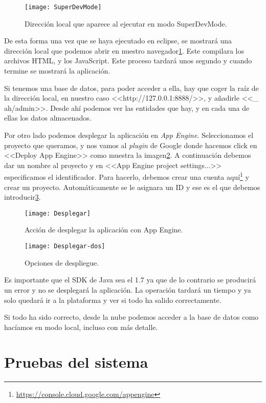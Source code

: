 \begin{figure}
\centering
\texttt{[image: SuperDevMode]}
\caption{Dirección local que aparece al ejecutar en modo SuperDevMode.}
\label{fig:5.4}
\end{figure}

De esta forma una vez que se haya ejecutado en eclipse, se mostrará una dirección local que podemos abrir en nuestro navegador\ref{fig:5.4}. Este compilara los archivos HTML, y los JavaScript. Este proceso tardará unos segundo y cuando termine se mostrará la aplicación.

Si tenemos una base de datos, para poder acceder a ella, hay que coger la raíz de la dirección local, en nuestro caso <<http://127.0.0.1:8888/>>, y añadirle <<\_ ah/admin>>. Desde ahí podemos ver las entidades que hay, y en cada una de ellas los datos almacenados.


Por otro lado podemos desplegar la aplicación en \emph{App Engine}. Seleccionamos el proyecto que queramos, y nos vamos al \emph{plugin} de Google donde hacemos click en <<Deploy App Engine>> como muestra la imagen\ref{fig:5.5}. A continuación debemos dar un nombre al proyecto y en <<App Engine project settings...>> especificamos el identificador. Para hacerlo, debemos crear una cuenta aquí\footnote{\url{https://console.cloud.google.com/appengine}} y crear un proyecto. Automáticamente se le asignara un ID y ese es el que debemos introducir\ref{fig:5.6}. 
\begin{figure}
\centering
\texttt{[image: Desplegar]}
\caption{Acción de desplegar la aplicación con App Engine.}
\label{fig:5.5}
\end{figure}

\begin{figure}
\centering
\texttt{[image: Desplegar-dos]}
\caption{Opciones de despliegue.}
\label{fig:5.6}
\end{figure}

Es importante que el SDK de Java sea el 1.7 ya que de lo contrario se producirá un error y no se desplegará la aplicación. La operación tardará un tiempo y ya solo quedará ir a la plataforma y ver si todo ha salido correctamente.

Si todo ha sido correcto, desde la nube podemos acceder a la base de datos como hacíamos en modo local, incluso con más detalle.

\section{Pruebas del sistema}


